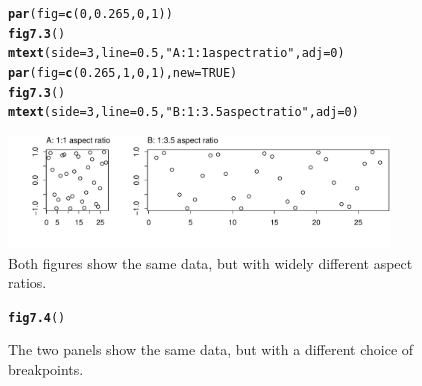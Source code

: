 \documentclass[12pt, a4paper,  BCOR=8.25mm, DIV=15]{scrartcl}\usepackage[]{graphicx}\usepackage[]{color}
\makeatletter
\newcommand{\hlnum}[1]{\textcolor[rgb]{0.686,0.059,0.569}{#1}}%
\newcommand{\hlstr}[1]{\textcolor[rgb]{0.192,0.494,0.8}{#1}}%
\newcommand{\hlstd}[1]{\textcolor[rgb]{0.345,0.345,0.345}{#1}}%
\newcommand{\hlkwc}[1]{\textcolor[rgb]{0.333,0.667,0.333}{#1}}%
\newcommand{\hlkwd}[1]{\textcolor[rgb]{0.737,0.353,0.396}{\textbf{#1}}}%
\newenvironment{kframe}{%
 \def\at@end@of@kframe{}%
 \ifinner\ifhmode%
  \def\at@end@of@kframe{\end{minipage}}%
  \begin{minipage}{\columnwidth}%
 \fi\fi%
 \def\FrameCommand##1{\hskip\@totalleftmargin \hskip-\fboxsep
 \colorbox{shadecolor}{##1}\hskip-\fboxsep
     \hskip-\linewidth \hskip-\@totalleftmargin \hskip\columnwidth}%
 \MakeFramed {\advance\hsize-\width
   \@totalleftmargin\z@ \linewidth\hsize
   \@setminipage}}%
 {\par\unskip\endMakeFramed%
 \at@end@of@kframe}
\newenvironment{knitrout}{}{} %
\makeatother
\begin{document}
\begin{figure}[ht]
\begin{knitrout}
\color{fgcolor}\begin{kframe}
\begin{alltt}
\hlkwd{par}\hlstd{(}\hlkwc{fig}\hlstd{=}\hlkwd{c}\hlstd{(}\hlnum{0}\hlstd{,}\hlnum{0.265}\hlstd{,} \hlnum{0}\hlstd{,}\hlnum{1}\hlstd{))}
\hlkwd{fig7.3}\hlstd{()}
\hlkwd{mtext}\hlstd{(}\hlkwc{side}\hlstd{=}\hlnum{3}\hlstd{,} \hlkwc{line}\hlstd{=}\hlnum{0.5}\hlstd{,} \hlstr{"A: 1:1 aspect ratio"}\hlstd{,} \hlkwc{adj}\hlstd{=}\hlnum{0}\hlstd{)}
\hlkwd{par}\hlstd{(}\hlkwc{fig}\hlstd{=}\hlkwd{c}\hlstd{(}\hlnum{0.265}\hlstd{,} \hlnum{1}\hlstd{,} \hlnum{0}\hlstd{,}\hlnum{1}\hlstd{),} \hlkwc{new}\hlstd{=}\hlnum{TRUE}\hlstd{)}
\hlkwd{fig7.3}\hlstd{()}
\hlkwd{mtext}\hlstd{(}\hlkwc{side}\hlstd{=}\hlnum{3}\hlstd{,} \hlkwc{line}\hlstd{=}\hlnum{0.5}\hlstd{,} \hlstr{"B: 1:3.5 aspect ratio"}\hlstd{,} \hlkwc{adj}\hlstd{=}\hlnum{0}\hlstd{)}
\end{alltt}
\end{kframe}

{\centering \includegraphics[width=0.9\textwidth]{figure/gph-fig7_3e-1} 

}



\end{knitrout}
\caption{Both figures show the same data, but with widely different
  aspect ratios.\label{fig:aspect}}
\end{figure}

\begin{figure}[ht]
\begin{knitrout}
\color{fgcolor}\begin{kframe}
\begin{alltt}
\hlkwd{fig7.4}\hlstd{()}
\end{alltt}
\end{kframe}
\end{knitrout}
\caption{The two panels show the same data, but with a different
choice of breakpoints.\label{fig:densitybreaks}}
\end{figure}
\end{document}
